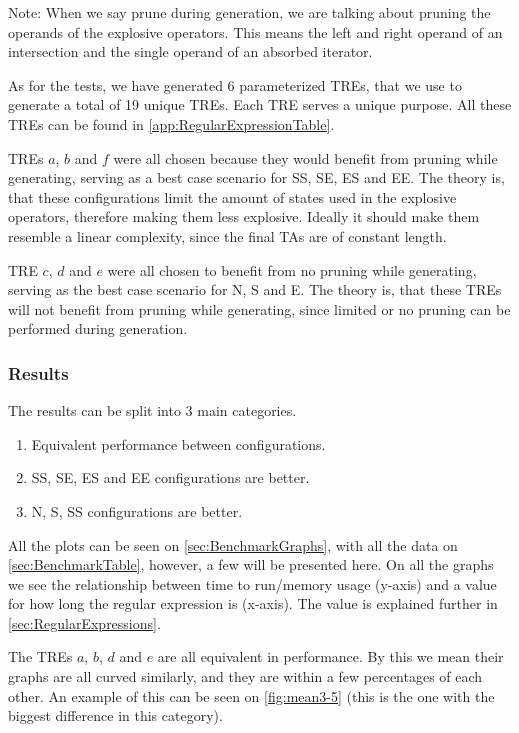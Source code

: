 Note: When we say prune during generation, we are talking about pruning the operands of the explosive operators.
This means the left and right operand of an intersection and the single operand of an absorbed iterator.

As for the tests, we have generated 6 parameterized TREs, that we use to generate a total of 19 unique TREs.
Each TRE serves a unique purpose.
All these TREs can be found in \cref{app:RegularExpressionTable}.

TREs $a$, $b$ and $f$ were all chosen because they would benefit from pruning while generating, serving as a best case scenario for SS, SE, ES and EE.
The theory is, that these configurations limit the amount of states used in the explosive operators, therefore making them less explosive.
Ideally it should make them resemble a linear complexity, since the final TAs are of constant length.

TRE $c$, $d$ and $e$ were all chosen to benefit from no pruning while generating, serving as the best case scenario for N, S and E.
The theory is, that these TREs will not benefit from pruning while generating, since limited or no pruning can be performed during generation.

\subsubsection{Results}
The results can be split into 3 main categories.

\begin{enumerate}
    \item Equivalent performance between configurations.
    \item SS, SE, ES and EE configurations are better.
    \item N, S, SS configurations are better.
\end{enumerate}

All the plots can be seen on \cref{sec:BenchmarkGraphs}, with all the data on \cref{sec:BenchmarkTable}, however, a few will be presented here.
On all the graphs we see the relationship between time to run/memory usage (y-axis) and a value for how long the regular expression is (x-axis). The value is explained further in \cref{sec:RegularExpressions}.

The TREs $a$, $b$, $d$ and $e$ are all equivalent in performance.
By this we mean their graphs are all curved similarly, and they are within a few percentages of each other.
An example of this can be seen on \cref{fig:mean3-5} (this is the one with the biggest difference in this category).

